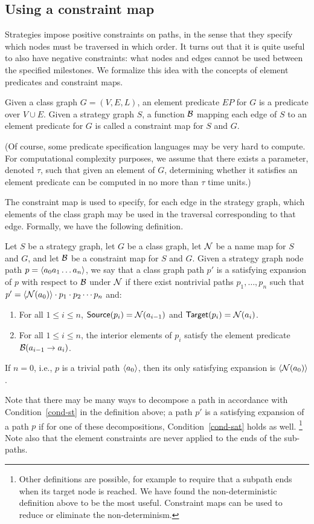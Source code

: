 \subsection{Using a constraint map}
\label{ssec-full-strategy}
Strategies impose positive constraints on paths, in the sense that
they specify which nodes must be traversed in which order. It turns
out that it is quite useful to also have negative constraints: what
nodes and edges cannot be used between the specified milestones.  We
formalize this idea with the concepts of element predicates and
constraint maps.

\begin{definition}
Given a class graph $G=(V,E,L)$, an {\sf element predicate} $EP$ for
$G$ is a predicate over $V\cup E$. Given a strategy graph $S$, a
function ${\cal B}$ mapping each edge of $S$ to an element predicate for
$G$ is called a {\sf constraint map} for $S$ and $G$.
\end{definition}
%
(Of course, some predicate specification languages may be very hard to
compute. For computational complexity purposes, we assume that there
exists a parameter, denoted $\tau$, such that given an element of $G$,
determining whether it satisfies an element predicate can be computed
in no more than $\tau$ time units.)

The constraint map is used to specify, for each edge in the strategy
graph, which elements of the class graph may be used in the traversal
corresponding to that edge.  Formally, we have the following
definition.

\begin{definition}
\label{def-sat}
Let $S$ be a strategy graph, let $G$ be a class graph, let ${\cal N}$ be a
name map for $S$ and $G$, and let ${\cal B}$ be a constraint map for $S$
and $G$.  Given a strategy graph node path $p=\left\langle a_0a_1\ldots a_n \right\rangle$, we
say that a class graph path $p'$ is a {\sf satisfying expansion} of
$p$ with respect to ${\cal B}$ under ${\cal N}$ if there exist nontrivial paths
$p_1,\ldots,p_n$ such that $p'=\left\langle {\cal N}(a_0) \right\rangle\cdot p_1\cdot p_2\cdots
p_n$ and:
\begin{enumerate}
\item
\label{cond-st}
For all $1\le i\le n$, $\mbox{\sf Source}(p_i)={\cal N}(a_{i-1})$ and
$\mbox{\sf Target}(p_i)={\cal N}(a_i)$.
\item
\label{cond-sat}
For all $1\le i\le n$, the interior elements of $p_i$ satisfy the
element predicate ${\cal B}(a_{i-1}\stackrel{}{\rightarrow}a_i)$.
\end{enumerate}
If $n = 0$, i.e., $p$ is a trivial path $\left\langle a_0 \right\rangle$, then its only
satisfying expansion is $\left\langle {\cal N}(a_0) \right\rangle$.
\end{definition}
Note that there may be many ways to decompose a path in accordance
with Condition~\ref{cond-st} in the definition above; a path $p'$ is a
satisfying expansion of a path $p$ if for one of these decompositions,
Condition~\ref{cond-sat} holds as well.%
\footnote{
Other definitions are possible, for example to require that a subpath
ends when its target node is reached.  We have found the
non-deterministic definition above to be the most useful.  Constraint
maps can be used to reduce or eliminate the non-determinism.
}
Note also that the element constraints are never applied to the ends
of the sub-paths.

